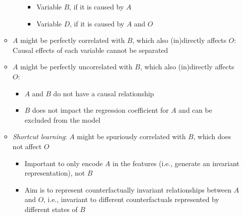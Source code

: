 \begin{itemize}
\begin{itemize}
\begin{itemize}
            \begin{itemize}
                \item Variable $B$, if it is caused by $A$
                \item Variable $D$, if it is caused by $A$ and $O$
            \end{itemize}
        \end{itemize}
        \item $A$ might be perfectly correlated with $B$, which also (in)directly affects $O$: Causal effects of each variable cannot be separated
        \item $A$ might be perfectly uncorrelated with $B$, which also (in)directly affects $O$:
        \begin{itemize}
            \item $A$ and $B$ do not have a causal relationship
            \item $B$ does not impact the regression coefficient for $A$ and can be excluded from the model
        \end{itemize}
        \item \emph{Shortcut learning}: $A$ might be spuriously correlated with $B$, which does not affect $O$
        \begin{itemize}
            \item Important to only encode $A$ in the features (i.e., generate an invariant representation), not $B$
            \item Aim is to represent counterfactually invariant relationships between $A$ and $O$, i.e., invariant to different counterfactuals represented by different states of $B$
        \end{itemize}
    \end{itemize}
\end{itemize}

